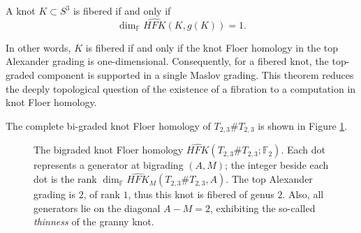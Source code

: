\begin{theorem}[Ni \cite{Ni07}]
    \label{theorem:ni-fibered}
    A knot $K \subset S^3$ is fibered if and only if
    \begin{equation}
        \dim_{\mathbb{F}} \widehat{HFK}(K, g(K)) = 1.
    \end{equation}
\end{theorem}

In other words, $K$ is fibered if and only if the knot Floer homology in the top Alexander grading is one-dimensional. Consequently, for a fibered knot, the top-graded component is supported in a single Maslov grading. This theorem reduces the deeply topological question of the existence of a fibration to a computation in knot Floer homology.

The complete bi-graded knot Floer homology of $T_{2,3}\#T_{2,3}$ is shown in Figure \ref{fig:hfk_granny}.

\begin{figure}[ht]
\centering
{}
\caption{The bigraded knot Floer homology 
$\widehat{HFK}(T_{2,3}\#T_{2,3};\mathbb{F}_2)$. Each dot represents a 
generator at bigrading $(A,M)$; the integer beside each dot is the rank 
$\dim_{\mathbb{F}}\widehat{HFK}_M(T_{2,3}\#T_{2,3},A)$. The top Alexander grading is $2$, of rank $1$, thus this knot is fibered of genus $2$. Also, all generators 
lie on the diagonal $A - M = 2$, exhibiting the so-called \emph{thinness} of the granny 
knot.}
\label{fig:hfk_granny}
\end{figure}


